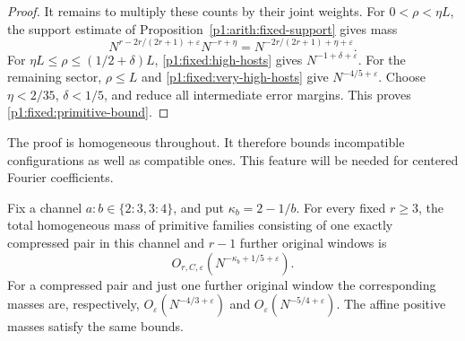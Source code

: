 \begin{proof}
It remains to multiply these counts by their joint
weights. For \(0<\rho<\eta L\), the support estimate
of Proposition~\ref{p1:arith:fixed-support} gives mass
\[
 N^{r-2r/(2r+1)+\varepsilon}
             N^{-r+\eta}
       =N^{-2r/(2r+1)+\eta+\varepsilon}.
\]
For \(\eta L\le\rho\le(1/2+\delta)L\),
\eqref{p1:fixed:high-hosts} gives
\(N^{-1+\delta+\varepsilon}\).
For the remaining sector, \(\rho\le L\) and
\eqref{p1:fixed:very-high-hosts} give
\(N^{-4/5+\varepsilon}\).
Choose \(\eta<2/35\), \(\delta<1/5\), and reduce all
intermediate error margins. This proves
\eqref{p1:fixed:primitive-bound}.
\end{proof}

The proof is homogeneous throughout. It therefore bounds
incompatible configurations as well as compatible ones.
This feature will be needed for centered Fourier coefficients.

\begin{proposition}
\label{p1:fixed:compressed}
Fix a channel \(a:b\in\{2:3,3:4\}\), and put
\(\kappa_b=2-1/b\). For every fixed \(r\ge3\), the total
homogeneous mass of primitive families consisting of
one exactly compressed pair in this channel and
\(r-1\) further original windows is
\begin{equation}
 O_{r,C,\varepsilon}
       (N^{-\kappa_b+1/5+\varepsilon}).
 \label{p1:fixed:compressed-bound}
\end{equation}
For a compressed pair and just one further original
window the corresponding masses are, respectively,
\(O_\varepsilon(N^{-4/3+\varepsilon})\) and
\(O_\varepsilon(N^{-5/4+\varepsilon})\).
The affine positive masses satisfy the same bounds.
\end{proposition}

